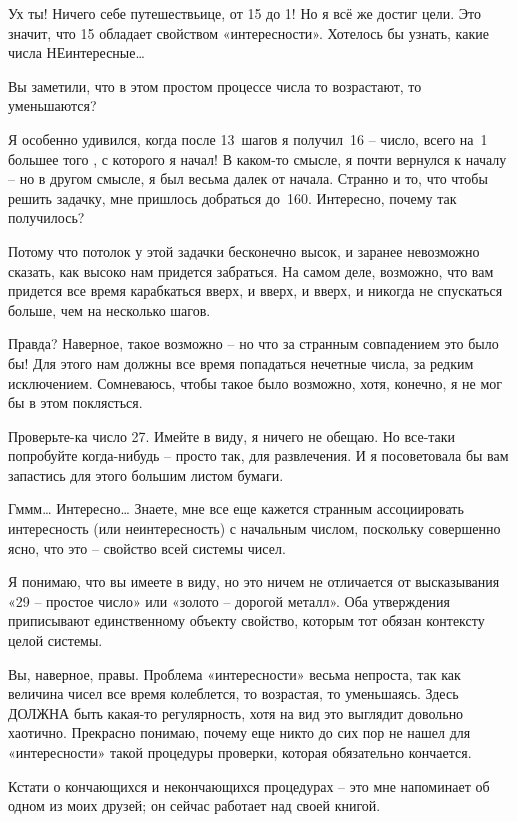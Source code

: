 \documentclass[../main.tex]{subfiles}
\begin{document}
\begin{dialogue}
Ух ты! Ничего себе путешествьице, от 15 до 1! Но я всё же достиг цели. Это значит, что 15 обладает свойством «интересности». Хотелось бы узнать, какие числа НЕинтересные\ldots{}

 Вы заметили, что в этом простом процессе числа то возрастают, то уменьшаются?

 Я особенно удивился, когда после 13~шагов я получил~16 \--- число, всего на~1 большее того , с которого я начал! В каком-то смысле, я почти вернулся к началу \--- но в другом смысле, я был весьма далек от начала. Странно и то, что чтобы решить задачку, мне пришлось добраться до~160. Интересно, почему так получилось?

 Потому что потолок у этой задачки бесконечно высок, и заранее невозможно сказать, как высоко нам придется забраться. На самом деле, возможно, что вам придется все время карабкаться вверх, и вверх, и вверх, и никогда не спускаться больше, чем на несколько шагов.

 Правда? Наверное, такое возможно \--- но что за странным совпадением это было бы! Для этого нам должны все время попадаться нечетные числа, за редким исключением. Сомневаюсь, чтобы такое было возможно, хотя, конечно, я не мог бы в этом поклясться.

 Проверьте-ка число 27. Имейте в виду, я ничего не обещаю. Но все-таки попробуйте когда-нибудь \--- просто так, для развлечения. И я посоветовала бы вам запастись для этого большим листом бумаги.

 Гммм\ldots{} Интересно\ldots{} Знаете, мне все еще кажется странным ассоциировать интересность (или неинтересность) с начальным числом, поскольку совершенно ясно, что это \--- свойство всей системы чисел.

 Я понимаю, что вы имеете в виду, но это ничем не отличается от высказывания «29 \--- простое число» или «золото \--- дорогой металл». Оба утверждения приписывают единственному объекту свойство, которым тот обязан контексту целой системы.

 Вы, наверное, правы. Проблема «интересности» весьма непроста, так как величина чисел все время колеблется, то возрастая, то уменьшаясь. Здесь ДОЛЖНА быть какая-то регулярность, хотя на вид это выглядит довольно хаотично. Прекрасно понимаю, почему еще никто до сих пор не нашел для «интересности» такой процедуры проверки, которая обязательно кончается.

 Кстати о кончающихся и некончающихся процедурах \--- это мне напоминает об одном из моих друзей; он сейчас работает над своей книгой.


\end{dialogue}
\end{document}
